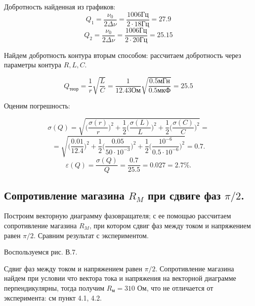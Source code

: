 \documentclass[12pt,a4paper]{article}
\begin{document}
            Добротность найденная из графиков:
            \[
            Q_1 = \frac{\nu_0}{2\Delta \nu} = \frac{1006\text{Гц}}{2\cdot18\text{Гц}}=27.9
            \]
            \[
            Q_2 = \frac{\nu_0}{2\Delta \nu} = \frac{1006\text{Гц}}{2\cdot20\text{Гц}}=25.15
            \]
            
            

            Найдем добротность контура вторым способом: рассчитаем добротность через параметры контура $R, L, C$.
            
            \[
            Q_\text{теор} = \frac{1}{r}\sqrt{\frac{L}{C}} = \frac{1}{12.43\text{Ом}}\sqrt{\frac{0.5\text{мГн}}{0.5\text{мкФ}}} = 25.5
            \]
            
            Оценим погрешность:
            
            \[
            \sigma(Q) = \sqrt{\Big(\frac{\sigma(r)}{r}\Big)^2 + \frac{1}{2}\Big(\frac{\sigma(L)}{L}\Big)^2 +\frac{1}{2}\Big(\frac{\sigma(C)}{C}\Big)^2}=
            \]
            \[
            = \sqrt{\Big(\frac{0.01}{12.4}\Big)^2 + \frac{1}{2}\Big(\frac{0.05}{50\cdot10^{-3}}\Big)^2 +\frac{1}{2}\Big(\frac{10^{-6}}{0.5\cdot10^{-6}}\Big)^2} = 0.7.
            \] 
            \[
            \varepsilon(Q) = \frac{\sigma(Q)}{Q} = \frac{0.7}{25.5} = 0.027 = 2.7\%.
            \]
            
        \newpage
        \subsection{Сопротивление магазина $R_M$ при сдвиге фаз $\pi/2$.}
        Построим векторную диаграмму фазовращателя; с ее помощью рассчитаем сопротивление магазина $R_M$, при котором сдвиг фаз между током и напряжением равен $\pi/2$. Сравним результат с экспериментом.
        
        Воспользуемся рис. В.7.
        
        Сдвиг фаз между током и напряжением равен $\pi/2$. Сопротивление магазина найдем при условии что вектора тока и напряжения на векторной диаграмме перпендикулярны, тогда получим $R_\text{м} = 310$ Ом, что не отличается от эксперимента: см пункт 4.1, 4.2. 
        
\end{document}
